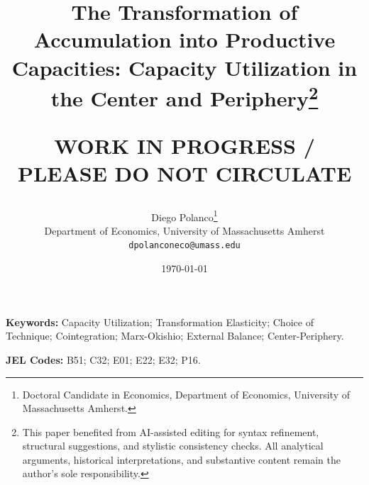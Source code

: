 \documentclass[11pt]{article}
\title{The Transformation of Accumulation into Productive Capacities: Capacity Utilization in the Center and Periphery\thanks{This paper benefited from AI-assisted editing for syntax refinement, structural suggestions, and stylistic consistency checks. All analytical arguments, historical interpretations, and substantive content remain the author's sole responsibility.}\\
\begin{large}
\textbf{WORK IN PROGRESS / PLEASE DO NOT CIRCULATE}     
\end{large}
}
\author{Diego Polanco\thanks{Doctoral Candidate in Economics, Department of Economics, University of Massachusetts Amherst.}\\
Department of Economics, University of Massachusetts Amherst\\
\texttt{dpolanconeco@umass.edu}}
\date{\today}
\begin{document}
\maketitle

\begin{abstract}

\end{abstract}

\vspace{1cm}

\noindent\textbf{Keywords:} Capacity Utilization; Transformation Elasticity; Choice of Technique; Cointegration; Marx-Okishio; External Balance; Center-Periphery.

\noindent\textbf{JEL Codes:} B51; C32; E01; E22; E32; P16.

\pagebreak

\FloatBarrier

\FloatBarrier

\FloatBarrier

\FloatBarrier

\FloatBarrier

\FloatBarrier


\pagebreak




\pagebreak
\appendix

\pagebreak

\pagebreak

\pagebreak

\end{document}
